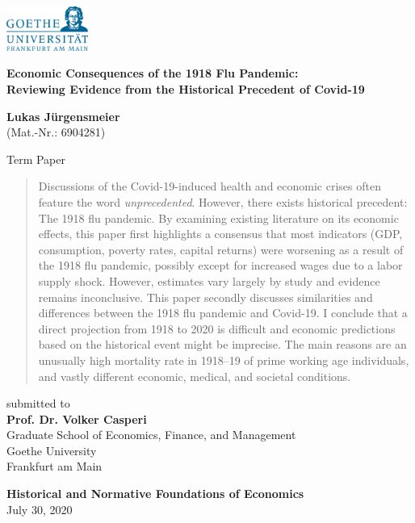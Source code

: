 \documentclass[12pt,a4paper]{article}
\begin{document}

\begin{center}
 \includegraphics[width=0.2\textwidth]{external/GU-Logo-blau-CMYK.eps} \vspace{1.5cm}
  
{\large{\bf Economic Consequences of the 1918 Flu Pandemic:\\
		Reviewing Evidence from the Historical Precedent of Covid-19}}

\textbf{Lukas J\"urgensmeier} \\
{\footnotesize (Mat.-Nr.: 6904281)}

  Term Paper \\\vspace{1.5cm}
  
  \begin{abstract}
  	Discussions of the Covid-19-induced health and economic crises often feature the word \textit{unprecedented}.
  	However, there exists historical precedent: The 1918 flu pandemic.
  	By examining existing literature on its economic effects, this paper first highlights a consensus that most indicators (GDP, consumption, poverty rates, capital returns) were worsening as a result of the 1918 flu pandemic, possibly except for increased wages due to a labor supply shock.
  	However, estimates vary largely by study and evidence remains inconclusive.
  	This paper secondly discusses similarities and differences between the 1918 flu pandemic and Covid-19.
  	I conclude that a direct projection from 1918 to 2020 is difficult and economic predictions based on the historical event might be imprecise.
  	The main reasons are an unusually high mortality rate in 1918--19 of prime working age individuals, and vastly different economic, medical, and societal conditions.
  	
  \end{abstract} \vspace{1.5cm}
  
  submitted to \\\vspace{0.5cm}
  \textbf{Prof. Dr. Volker Casperi} \\
  Graduate School of Economics, Finance, and Management \\
  Goethe University \\
  Frankfurt am Main \vspace{1.5cm}
  
  \textbf{Historical and Normative Foundations of Economics} \\\vspace{0.5cm}
  July 30, 2020
  
\end{center}
\end{document}
